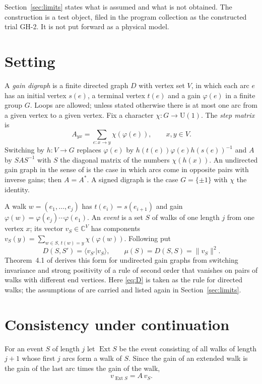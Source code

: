 Section~\ref{sec:limits} states what is assumed and what is not obtained. The construction is a test object, filed in the program collection as the constructed trial GH-2. It is not put forward as a physical model.

\section{Setting}\label{sec:setting}

A \emph{gain digraph} is a finite directed graph $D$ with vertex set $V$, in which each arc $e$ has an initial vertex $s(e)$, a terminal vertex $t(e)$ and a gain $\varphi(e)$ in a finite group $G$. Loops are allowed; unless stated otherwise there is at most one arc from a given vertex to a given vertex. Fix a character $\chi\colon G\to\mathrm{U}(1)$. The \emph{step matrix} is
\[
A_{yx}=\sum_{e\colon x\to y}\chi(\varphi(e)),\qquad x,y\in V .
\]
Switching by $h\colon V\to G$ replaces $\varphi(e)$ by $h(t(e))\varphi(e)h(s(e))^{-1}$ and $A$ by $SAS^{-1}$ with $S$ the diagonal matrix of the numbers $\chi(h(x))$. An undirected gain graph in the sense of \cite{g8} is the case in which arcs come in opposite pairs with inverse gains; then $A=A^*$. A signed digraph is the case $G=\{\pm1\}$ with $\chi$ the identity.

A walk $w=(e_1,\dots,e_j)$ has $t(e_i)=s(e_{i+1})$ and gain $\varphi(w)=\varphi(e_j)\cdots\varphi(e_1)$. An \emph{event} is a set $S$ of walks of one length $j$ from one vertex $x$; its vector $v_S\in\mathbb{C}^V$ has components $v_S(y)=\sum_{w\in S,\,t(w)=y}\chi(\varphi(w))$. Following \cite{g8} put
\begin{equation}\label{eq:D}
D(S,S')=\langle v_{S'}|v_S\rangle,\qquad \mu(S)=D(S,S)=\lVert v_S\rVert^2 .
\end{equation}
Theorem~4.1 of \cite{g8} derives this form for undirected gain graphs from switching invariance and strong positivity of a rule of second order that vanishes on pairs of walks with different end vertices. Here \eqref{eq:D} is taken as the rule for directed walks; the assumptions of \cite{g8} are carried and listed again in Section~\ref{sec:limits}.

\section{Consistency under continuation}\label{sec:cont}

For an event $S$ of length $j$ let $\operatorname{Ext}S$ be the event consisting of all walks of length $j+1$ whose first $j$ arcs form a walk of $S$. Since the gain of an extended walk is the gain of the last arc times the gain of the walk,
\begin{equation}\label{eq:ext}
v_{\operatorname{Ext}S}=A\,v_S .
\end{equation}

